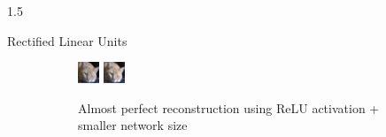 \documentclass[final]{beamer}
\newlength{\onecolwid}
\begin{document}
\begin{frame}[t]
\begin{columns}[t]
\begin{column}{1.5\onecolwid}
\begin{alertblock}{Rectified Linear Units}
\begin{figure}
\begin{subfigure}{0.4\linewidth}
					\centering
					\includegraphics[width=0.4\linewidth]{graphics/reconstructions/cifar/relu/input_00_relu.png}
					\includegraphics[width=0.4\linewidth]{graphics/reconstructions/cifar/relu/reconstruction_00_relu.png}

					\caption{Almost perfect reconstruction using ReLU activation + smaller network size}

				\end{subfigure}
				\begin{subfigure}{0.4\linewidth}


\end{subfigure}
\end{figure}
\end{alertblock}
\end{column}
\end{columns}
\end{frame}
\end{document}
